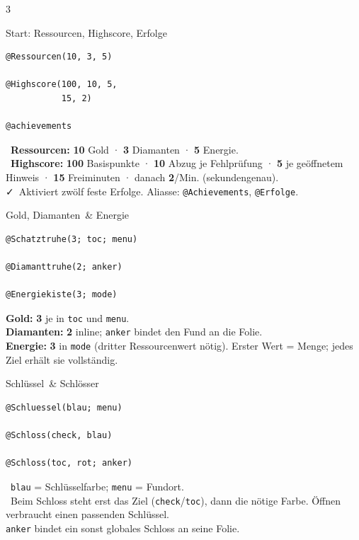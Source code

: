 \documentclass[a4paper,landscape,9pt]{extarticle}
\newcommand{\prevsm}[1]{{\footnotesize\color{muted} #1}}
\newcommand{\lootval}[1]{{\ttfamily\bfseries\color{lootteal}#1}}
\begin{document}
\begingroup
\setlength{\multicolsep}{2pt}
\begin{multicols}{3}

\begin{lootcard}{Start: Ressourcen, Highscore, Erfolge}
\begin{lstlisting}[language=lia]
@Ressourcen(10, 3, 5)

@Highscore(100, 10, 5,
           15, 2)

@achievements
\end{lstlisting}
\tcblower
\prevsm{\faSlidersH~\textbf{Ressourcen:} \lootval{10} Gold · \lootval{3} Diamanten · \lootval{5} Energie.\\[2pt]
\faChartLine~\textbf{Highscore:} \lootval{100} Basispunkte · \lootval{10} Abzug je Fehlprüfung · \lootval{5} je geöffnetem Hinweis · \lootval{15} Freiminuten · danach \lootval{2}/Min. (sekundengenau).\\[2pt]
\faCheck~Aktiviert zwölf feste Erfolge. Aliasse: \texttt{@Achievements}, \texttt{@Erfolge}.}
\end{lootcard}

\begin{lootcard}{Gold, Diamanten \,\& Energie}
\begin{lstlisting}[language=lia]
@Schatztruhe(3; toc; menu)

@Diamanttruhe(2; anker)

@Energiekiste(3; mode)
\end{lstlisting}
\tcblower
\prevsm{\textbf{Gold:} \lootval{3} je in \texttt{toc} und \texttt{menu}.\\[1.5pt]
\textbf{Diamanten:} \lootval{2} inline; \texttt{anker} bindet den Fund an die Folie.\\[1.5pt]
\textbf{Energie:} \lootval{3} in \texttt{mode} (dritter Ressourcenwert nötig). Erster Wert = Menge; jedes Ziel erhält sie vollständig.}
\end{lootcard}

\begin{lootcard}{Schlüssel \,\& Schlösser}
\begin{lstlisting}[language=lia]
@Schluessel(blau; menu)

@Schloss(check, blau)

@Schloss(toc, rot; anker)
\end{lstlisting}
\tcblower
\prevsm{\faKey~\texttt{blau} = Schlüsselfarbe; \texttt{menu} = Fundort.\\[2pt]
\faPuzzlePiece~Beim Schloss steht erst das Ziel (\texttt{check}/\texttt{toc}), dann die nötige Farbe. Öffnen verbraucht einen passenden Schlüssel.\\[2pt]
{\footnotesize \texttt{anker} bindet ein sonst globales Schloss an seine Folie.}}
\end{lootcard}


\end{multicols}
\end{document}
